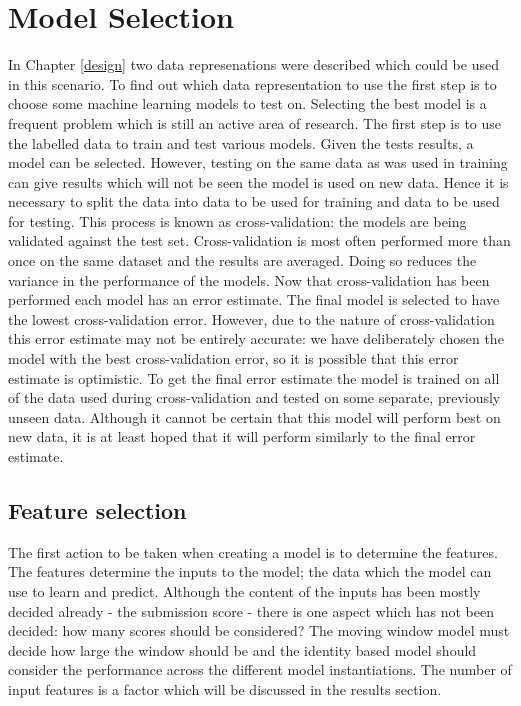 \chapter{Model Selection}
\label{machinelearning}
In Chapter \ref{design} two data represenations were described which could be used in this scenario. To find out which data representation to use the first step is to choose some machine learning models to test on. Selecting the best model is a frequent problem which is still an active area of research. The first step is to use the labelled data to train and test various models. Given the tests results, a model can be selected. However, testing on the same data as was used in training can give results which will not be seen the model is used on new data. Hence it is necessary to split the data into data to be used for training and data to be used for testing. This process is known as cross-validation: the models are being validated against the test set. Cross-validation is most often performed more than once on the same dataset and the results are averaged. Doing so reduces the variance in the performance of the models.
Now that cross-validation has been performed each model has an error estimate. The final model is selected to have the lowest cross-validation error. However, due to the nature of cross-validation this error estimate may not be entirely accurate: we have deliberately chosen the model with the best cross-validation error, so it is possible that this error estimate is optimistic. To get the final error estimate the model is trained on all of the data used during cross-validation and tested on some separate, previously unseen data.
Although it cannot be certain that this model will perform best on new data, it is at least hoped that it will perform similarly to the final error estimate.

\section{Feature selection}
The first action to be taken when creating a model is to determine the features. The features determine the inputs to the model; the data which the model can use to learn and predict. Although the content of the inputs has been mostly decided already - the submission score - there is one aspect which has not been decided: how many scores should be considered? The moving window model must decide how large the window should be and the identity based model should consider the performance across the different model instantiations. The number of input features is a factor which will be discussed in the results section.


